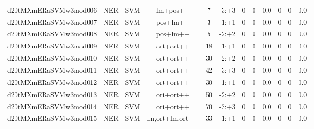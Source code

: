 \documentclass[a4paper]{article}
\begin{document}
\begin{landscape}
\begin{center}
\begin{tabular}{ |c|c|c|c|c|c|c|c|c|c|c|c|}
 
 	
 	\small{ d20tMXmERaSVMw3mod006 } & \small{ NER} & \small{  SVM }  & lm+pos++  &  7 &  \small{  -3:+3 }  &  0 & 0 & 0.0  &  0 & 0 & 0.0 \\
 	

 
 	
 	\small{ d20tMXmERaSVMw3mod007 } & \small{ NER} & \small{  SVM }  & pos+lm++  &  3 &  \small{  -1:+1 }  &  0 & 0 & 0.0  &  0 & 0 & 0.0 \\
 	

 
 	
 	\small{ d20tMXmERaSVMw3mod008 } & \small{ NER} & \small{  SVM }  & pos+lm++  &  5 &  \small{  -2:+2 }  &  0 & 0 & 0.0  &  0 & 0 & 0.0 \\
 	

 
 	
 	\small{ d20tMXmERaSVMw3mod009 } & \small{ NER} & \small{  SVM }  & ort+ort++  &  18 &  \small{  -1:+1 }  &  0 & 0 & 0.0  &  0 & 0 & 0.0 \\
 	

 
 	
 	\small{ d20tMXmERaSVMw3mod010 } & \small{ NER} & \small{  SVM }  & ort+ort++  &  30 &  \small{  -2:+2 }  &  0 & 0 & 0.0  &  0 & 0 & 0.0 \\
 	

 
 	
 	\small{ d20tMXmERaSVMw3mod011 } & \small{ NER} & \small{  SVM }  & ort+ort++  &  42 &  \small{  -3:+3 }  &  0 & 0 & 0.0  &  0 & 0 & 0.0 \\
 	

 
 	
 	\small{ d20tMXmERaSVMw3mod012 } & \small{ NER} & \small{  SVM }  & ort+ort++  &  30 &  \small{  -1:+1 }  &  0 & 0 & 0.0  &  0 & 0 & 0.0 \\
 	

 
 	
 	\small{ d20tMXmERaSVMw3mod013 } & \small{ NER} & \small{  SVM }  & ort+ort++  &  50 &  \small{  -2:+2 }  &  0 & 0 & 0.0  &  0 & 0 & 0.0 \\
 	

 
 	
 	\small{ d20tMXmERaSVMw3mod014 } & \small{ NER} & \small{  SVM }  & ort+ort++  &  70 &  \small{  -3:+3 }  &  0 & 0 & 0.0  &  0 & 0 & 0.0 \\
 	

 
 	
 	\small{ d20tMXmERaSVMw3mod015 } & \small{ NER} & \small{  SVM }  & lm,ort+lm,ort++  &  33 &  \small{  -1:+1 }  &  0 & 0 & 0.0  &  0 & 0 & 0.0 \\
 	


\end{tabular}
\end{center}
\end{landscape}
\end{document}
